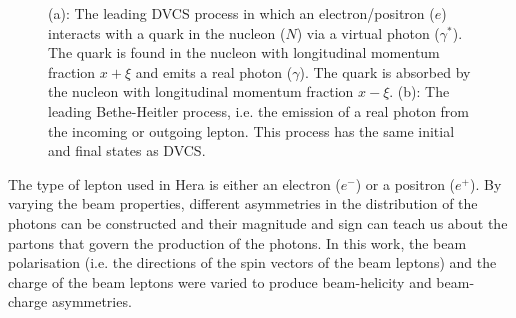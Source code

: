 \documentclass[11pt]{article}
\begin{document}
\begin{figure}
\begin{center}
\caption[DVCS and Bethe Heitler hand bag diagram.]{(a): The leading DVCS process in which an electron/positron ($e$) interacts with a quark in the nucleon
($N$) via a virtual photon ($\gamma^\ast$). The quark is found in the
nucleon with longitudinal momentum fraction $x+\xi$ and emits a real
photon ($\gamma$). The quark is absorbed by the nucleon with
longitudinal momentum fraction $x-\xi$. (b): The leading Bethe-Heitler process, i.e. the emission of a real photon from the incoming or outgoing lepton. This process has the same initial and final states as DVCS.}
\label{spin}
\end{center}
\end{figure}

The type of lepton used in H{\sc era} is either an electron ($e^-$) or a positron ($e^+$). By varying the beam properties, different asymmetries in the distribution of the photons can be constructed and their magnitude and sign can teach us about the partons that govern the production of the photons. In this work, the beam polarisation (i.e. the directions of the spin vectors of the beam leptons) and the charge of the beam leptons were varied to produce beam-helicity and beam-charge asymmetries.
\end{document}
